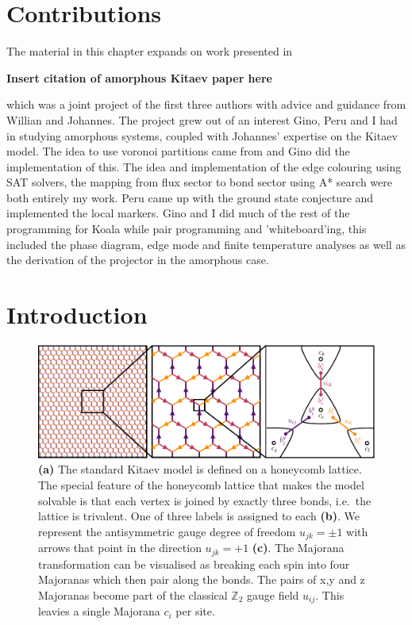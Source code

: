 \hypertarget{contributions}{%
\section{Contributions}\label{contributions}}

The material in this chapter expands on work presented in

\textbf{Insert citation of amorphous Kitaev paper here}

which was a joint project of the first three authors with advice and guidance from Willian and Johannes. The project grew out of an interest Gino, Peru and I had in studying amorphous systems, coupled with Johannes' expertise on the Kitaev model. The idea to use voronoi partitions came from \autocite{marsalTopologicalWeaireThorpe2020} and Gino did the implementation of this. The idea and implementation of the edge colouring using SAT solvers, the mapping from flux sector to bond sector using A* search were both entirely my work. Peru came up with the ground state conjecture and implemented the local markers. Gino and I did much of the rest of the programming for Koala while pair programming and 'whiteboard'ing, this included the phase diagram, edge mode and finite temperature analyses as well as the derivation of the projector in the amorphous case.

\hypertarget{introduction}{%
\section{Introduction}\label{introduction}}

\begin{figure}
\hypertarget{fig:intro_figure_by_hand}{%
\centering
\includegraphics[width=1\textwidth,height=\textheight]{figure_code/amk_chapter/intro/honeycomb_zoom/intro_figure_by_hand}
\caption[The Kitaev Honeycomb Model]{\textbf{(a)} The standard Kitaev model is defined on a
honeycomb lattice. The special feature of the honeycomb lattice that
makes the model solvable is that each vertex is joined by exactly three
bonds, i.e.~the lattice is trivalent. One of three labels is assigned to
each \textbf{(b)}. We represent the antisymmetric gauge degree of
freedom \(u_{jk} = \pm 1\) with arrows that point in the direction
\(u_{jk} = +1\) \textbf{(c)}. The Majorana transformation can be
visualised as breaking each spin into four Majoranas which then pair
along the bonds. The pairs of x,y and z Majoranas become part of the
classical \(\mathbb{Z}_2\) gauge field \(u_{ij}\). This leavies a single
Majorana \(c_i\) per site.}\label{fig:intro_figure_by_hand}
}
\end{figure}

